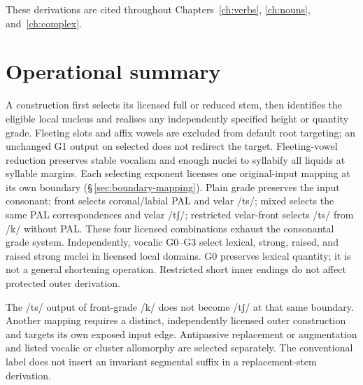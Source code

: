 These derivations are cited throughout Chapters~\ref{ch:verbs}, \ref{ch:nouns},
and~\ref{ch:complex}.

\section{Operational summary}

A construction first selects its licensed full or reduced stem, then
identifies the eligible local nucleus and realises any independently
specified height or quantity grade. Fleeting slots and affix vowels are
excluded from default root targeting; an unchanged G1 output on selected
 does not redirect the target. Fleeting-vowel reduction preserves
stable vocalism and enough nuclei to syllabify all liquids at syllable
margins. Each selecting exponent licenses one original-input mapping at
its own boundary (§\,\ref{sec:boundary-mapping}). Plain grade preserves
the input consonant; front selects coronal/labial PAL and velar /ts/;
mixed selects the same PAL correspondences and velar /tʃ/; restricted
velar-front selects /ts/ from /k/ without PAL. These four licensed
combinations exhaust the consonantal grade system. Independently, vocalic
G0--G3 select lexical, strong, raised, and raised strong nuclei in licensed
local domains. G0 preserves lexical quantity; it is not a general shortening
operation. Restricted short inner endings do not affect protected outer
derivation.

The /ts/ output of front-grade /k/ does not become /tʃ/ at that same
boundary. Another mapping requires a distinct, independently licensed
outer construction and targets its own exposed input edge. Antipassive
replacement or augmentation and listed vocalic or cluster allomorphy
are selected separately. The conventional label  does not
insert an invariant segmental suffix in a replacement-stem derivation.

